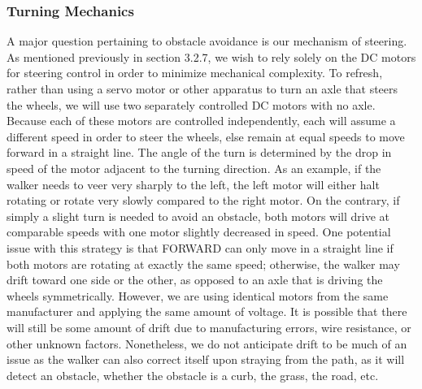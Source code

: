 \subsubsection{Turning Mechanics}
\noindent A major question pertaining to obstacle avoidance is our mechanism of steering. As mentioned previously in section 3.2.7, we wish to rely solely on the DC motors for steering control in order to minimize mechanical complexity.  To refresh, rather than using a servo motor or other apparatus to turn an axle that steers the wheels, we will use two separately controlled DC motors with no axle. Because each of these motors are controlled independently, each will assume a different speed in order to steer the wheels, else remain at equal speeds to move forward in a straight line. The angle of the turn is determined by the drop in speed of the motor adjacent to the turning direction. As an example, if the walker needs to veer very sharply to the left, the left motor will either halt rotating or rotate very slowly compared to the right motor. On the contrary, if simply a slight turn is needed to avoid an obstacle, both motors will drive at comparable speeds with one motor slightly decreased in speed. One potential issue with this strategy is that FORWARD can only move in a straight line if both motors are rotating at exactly the same speed; otherwise, the walker may drift toward one side or the other, as opposed to an axle that is driving the wheels symmetrically. However, we are using identical motors from the same manufacturer and applying the same amount of voltage. It is possible that there will still be some amount of drift due to manufacturing errors, wire resistance, or other unknown factors. Nonetheless, we do not anticipate drift to be much of an issue as the walker can also correct itself upon straying from the path, as it will detect an obstacle, whether the obstacle is a curb, the grass, the road, etc.\\

